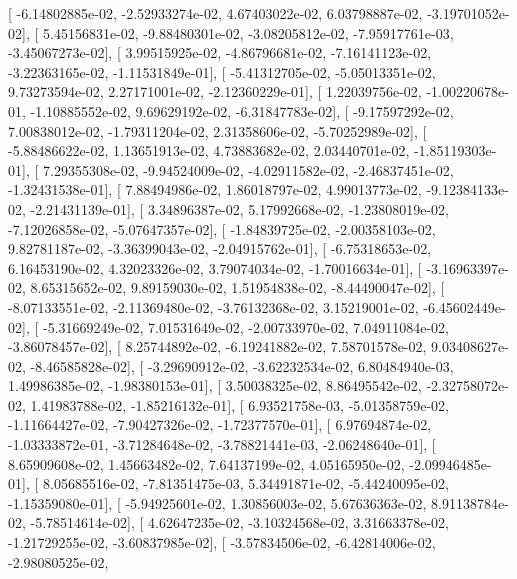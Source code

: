 \documentclass{article}
\begin{document}
       [ -6.14802885e-02,  -2.52933274e-02,   4.67403022e-02,
          6.03798887e-02,  -3.19701052e-02],
       [  5.45156831e-02,  -9.88480301e-02,  -3.08205812e-02,
         -7.95917761e-03,  -3.45067273e-02],
       [  3.99515925e-02,  -4.86796681e-02,  -7.16141123e-02,
         -3.22363165e-02,  -1.11531849e-01],
       [ -5.41312705e-02,  -5.05013351e-02,   9.73273594e-02,
          2.27171001e-02,  -2.12360229e-01],
       [  1.22039756e-02,  -1.00220678e-01,  -1.10885552e-02,
          9.69629192e-02,  -6.31847783e-02],
       [ -9.17597292e-02,   7.00838012e-02,  -1.79311204e-02,
          2.31358606e-02,  -5.70252989e-02],
       [ -5.88486622e-02,   1.13651913e-02,   4.73883682e-02,
          2.03440701e-02,  -1.85119303e-01],
       [  7.29355308e-02,  -9.94524009e-02,  -4.02911582e-02,
         -2.46837451e-02,  -1.32431538e-01],
       [  7.88494986e-02,   1.86018797e-02,   4.99013773e-02,
         -9.12384133e-02,  -2.21431139e-01],
       [  3.34896387e-02,   5.17992668e-02,  -1.23808019e-02,
         -7.12026858e-02,  -5.07647357e-02],
       [ -1.84839725e-02,  -2.00358103e-02,   9.82781187e-02,
         -3.36399043e-02,  -2.04915762e-01],
       [ -6.75318653e-02,   6.16453190e-02,   4.32023326e-02,
          3.79074034e-02,  -1.70016634e-01],
       [ -3.16963397e-02,   8.65315652e-02,   9.89159030e-02,
          1.51954838e-02,  -8.44490047e-02],
       [ -8.07133551e-02,  -2.11369480e-02,  -3.76132368e-02,
          3.15219001e-02,  -6.45602449e-02],
       [ -5.31669249e-02,   7.01531649e-02,  -2.00733970e-02,
          7.04911084e-02,  -3.86078457e-02],
       [  8.25744892e-02,  -6.19241882e-02,   7.58701578e-02,
          9.03408627e-02,  -8.46585828e-02],
       [ -3.29690912e-02,  -3.62232534e-02,   6.80484940e-03,
          1.49986385e-02,  -1.98380153e-01],
       [  3.50038325e-02,   8.86495542e-02,  -2.32758072e-02,
          1.41983788e-02,  -1.85216132e-01],
       [  6.93521758e-03,  -5.01358759e-02,  -1.11664427e-02,
         -7.90427326e-02,  -1.72377570e-01],
       [  6.97694874e-02,  -1.03333872e-01,  -3.71284648e-02,
         -3.78821441e-03,  -2.06248640e-01],
       [  8.65909608e-02,   1.45663482e-02,   7.64137199e-02,
          4.05165950e-02,  -2.09946485e-01],
       [  8.05685516e-02,  -7.81351475e-03,   5.34491871e-02,
         -5.44240095e-02,  -1.15359080e-01],
       [ -5.94925601e-02,   1.30856003e-02,   5.67636363e-02,
          8.91138784e-02,  -5.78514614e-02],
       [  4.62647235e-02,  -3.10324568e-02,   3.31663378e-02,
         -1.21729255e-02,  -3.60837985e-02],
       [ -3.57834506e-02,  -6.42814006e-02,  -2.98080525e-02,
\end{document}

